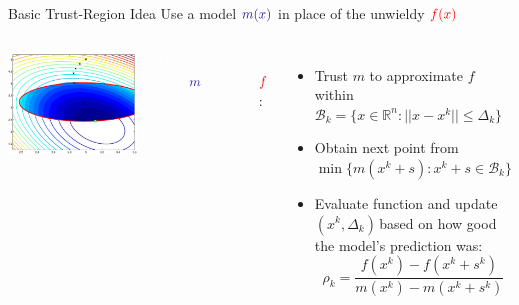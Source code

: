 \documentclass[handout,aspectratio=54]{beamer}
\numberwithin{theorem}{section}
\begin{document}
\begin{frame}{Basic Trust-Region Idea}
Use a model $\textcolor{blue}{m(x)}$ in place of the unwieldy $\textcolor{red}{f(x)}$

\begin{columns}
\includegraphics[width=\textwidth]{fig/22-6.jpg}

\colorbox[rgb]{0.5,0.6,0.7}{\textcolor{white}{Optimize over }$\textcolor{blue}{m}$ \textcolor{white}{to avoidexpense }}

\colorbox[rgb]{0.5,0.6,0.7}{\textcolor{white}{of} $\textcolor{red}{f}$:}

\begin{itemize}
\item Trust $m$ to approximate $f$ within $ \mathcal{B}_k=\{x\in\mathbb{R}^n:||x-x^k||\le \Delta_k\}$
\item Obtain next point from $\min\{m(x^k+s):x^k+s\in  \mathcal{B}_k\}$
\item Evaluate function and update $(x^k, \Delta_k)$\,based on how good the model's prediction was:
\begin{equation*}
\rho_k=\frac{f(x^k)-f(x^k+s^k)}{m(x^k)-m(x^k+s^k)}
\end{equation*}
\end{itemize}

\footnotesize{}
\end{columns}
\end{frame}
\end{document}
